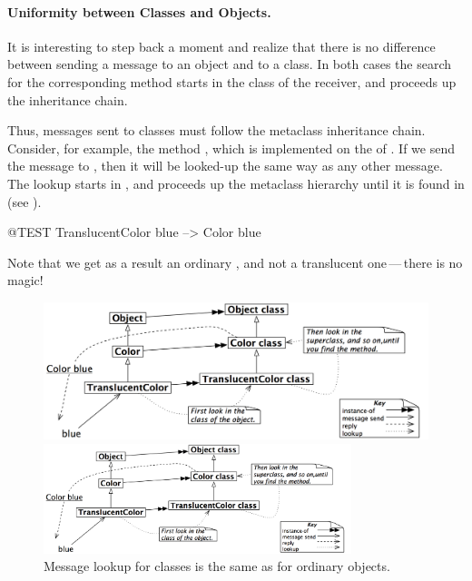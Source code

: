 \documentclass[a4paper,10pt,twoside]{book}
\begin{document}
\paragraph{Uniformity between Classes and Objects.}
It is interesting to step back a moment and realize that there is no difference between sending a message to an object and to a class. 
In both cases the search for the corresponding method starts in the class of the receiver, and proceeds up the inheritance chain.

Thus, messages sent to classes must follow the metaclass inheritance chain.
Consider, for example, the method , which is implemented on the  of .
If we send the message  to , then it will be looked-up the same way as any other message.
The lookup starts in , and proceeds up the metaclass hierarchy until it is found in  (see ).

\begin{code}{@TEST}
TranslucentColor blue --> Color blue
\end{code}
\noindent
Note that we get as a result an ordinary , and not a translucent one\,---\,there is no magic!

\begin{center}
\begin{figure}[!ht]
\ifluluelse
	{\centerline {\includegraphics[width=\textwidth]{TranslucentColorBlue}}}
	{\centerline {\includegraphics[width=0.8\textwidth]{TranslucentColorBlue}}}
\caption{Message lookup for classes is the same as for ordinary objects.\label{fig:metaclasslookup}}
\end{figure}
\end{center}
\end{document}
